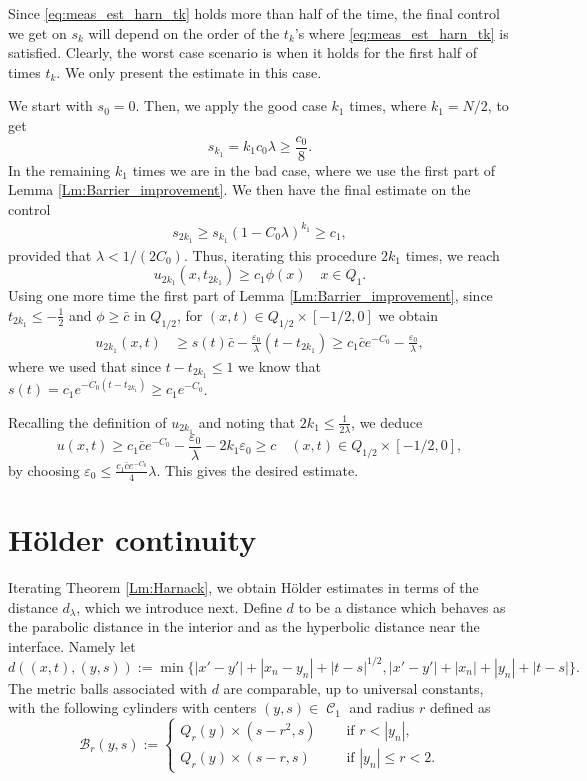 \documentclass[12pt]{article}
\makeatletter
\newenvironment{customproof}[1]{%
  \par\pushQED{\qed}%
  \normalfont\topsep6pt \trivlist
  \item[\hskip\labelsep\itshape
    Proof of #1\@addpunct{.}]\ignorespaces
}{%
  \popQED\endtrivlist\@endpefalse
}
\numberwithin{Theorem}{section}
\theoremstyle{definition}
\theoremstyle{remark}
\numberwithin{equation}{section}
\DeclareMathOperator{\C}{\mathcal{C}}
\newcommand{\eps}{\varepsilon}
\makeatother
\begin{document}
\begin{customproof}{Lemma \ref{Lm:Harnack1}}
    Since \eqref{eq:meas_est_harn_tk} holds more than half of the time, the final control we get on $s_k$ will depend on the order of the $t_k$'s where \eqref{eq:meas_est_harn_tk} is satisfied. Clearly, the worst case scenario is when it holds for the first half of times $t_k$. We only present the estimate in this case.

    We start with $s_0=0$. Then, we apply the good case $k_1$ times, where $k_1=N/2$, to get
    \[
    s_{k_1}= k_1c_0\lambda \ge\frac{c_0}{8}.
    \]
    In the remaining $k_1$ times we are in the bad case, where we use the first part of Lemma \ref{Lm:Barrier_improvement}. We then have the final estimate on the control
    \begin{align*}
        s_{2k_1}\geq s_{k_1}(1-C_0\lambda)^{k_1}\geq c_1,
    \end{align*}
    provided that $\lambda< 1/(2C_0)$.  
    Thus, iterating this procedure $2k_1$ times, we reach
    $$
    u_{2k_1}(x,t_{2k_1}) \geq c_1 \phi(x) \quad  x \in Q_1.
    $$
    Using one more time the first part of Lemma \ref{Lm:Barrier_improvement}, since $t_{2k_1}\leq -\frac{1}{2}$ and $\phi\geq \bar c$ in $Q_{1/2}$, for $ (x,t) \in Q_{1/2}\times [-1/2,0]$ we obtain
    \begin{align*}
            u_{2k_1}(x,t) &\geq s(t) \bar c -\frac{\eps_0}{\lambda}(t-t_{2k_1}) \geq c_1 \bar c e^{-C_0} -  \frac{\eps_0}{\lambda},
    \end{align*}
    where we used that since $t-t_{2k_1} \leq 1$ we know that $s(t)=c_1 e^{-C_0(t-t_{2k_1})} \geq c_1 e^{-C_0}$.
    
Recalling the definition of $ u_{2k_1}$ and noting that $2k_1 \leq \frac{1}{2\lambda}$, we deduce
\[
u(x,t) \geq c_1\bar c  e^{-C_0} - \frac{\eps_0}{\lambda} - 2k_1 \eps_{0}\geq c \quad  (x,t) \in Q_{1/2}\times [-1/2,0] ,
\]
by choosing  $\eps_0\leq \frac{c_1 \bar c e^{-C_0} }{4}\lambda$. This gives the desired estimate.
\end{customproof}



\section{H\"older continuity}\label{sec:holder}

Iterating Theorem \ref{Lm:Harnack}, we obtain H\"older estimates in terms of the distance $d_\lambda$, which we introduce next.
Define $d$ to be a distance which behaves as the parabolic distance in the interior and as the hyperbolic distance near the interface. Namely let 
\[ 
d((x,t),(y,s)):= \min \{|x'-y'|+|x_n-y_n|+|t-s|^{1/2}, |x'-y'|+|x_n|+|y_n|+|t-s| \}.
\]
 The metric balls associated with \(d\) are comparable, up to universal constants, with the following cylinders with centers $(y,s) \in \C_1$ and radius $r$ defined as
\begin{equation}\label{eq:def_ballBr}
    \mathcal{B}_r (y,s):= \begin{cases} Q_r(y) \times (s-r^2,s) \quad &\text{ if }r <|y_n|, \\
   Q_r(y) \times (s-r,s) \quad &\text{ if }|y_n|\leq r<2.
    \end{cases}
\end{equation}
\end{document}
